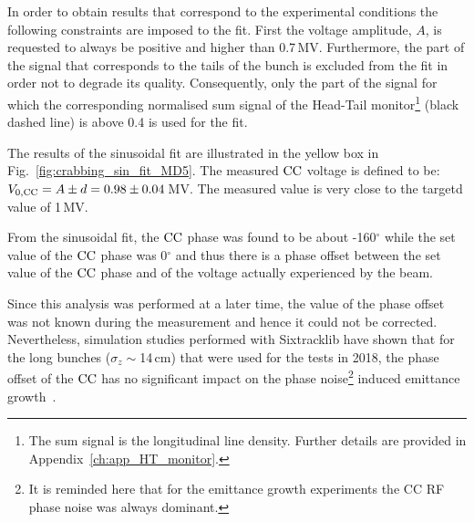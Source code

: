 In order to obtain results that correspond to the experimental conditions the following constraints are imposed to the fit. First the voltage amplitude, $A$, is requested to always be positive and higher than 0.7\,MV. Furthermore, the part of the signal that corresponds to the tails of the bunch is excluded from the fit in order not to degrade its quality. Consequently, only the part of the signal for which the corresponding normalised sum signal of the Head-Tail monitor\footnote{The sum signal is the longitudinal line density. Further details are provided in Appendix~\ref{ch:app_HT_monitor}.} (black dashed line) is above 0.4 is used for the fit. 

The results of the sinusoidal fit are illustrated in the yellow box in Fig.~\ref{fig:crabbing_sin_fit_MD5}. The measured ${\mathrm{CC}}$ voltage is defined to be: ${V_\mathrm{0, CC}}= A \pm d=0.98\pm0.04$\,MV. The measured value is very close to the targetd value of 1\,MV. 

From the sinusoidal fit, the ${\mathrm{CC}}$ phase was found to be about -160$^\circ$ while the set value of the ${\mathrm{CC}}$ phase was 0$^\circ$ and thus there is a phase offset between the set value of the ${\mathrm{CC}}$ phase and of the voltage actually experienced by the beam.



Since this analysis was performed at a later time, the value of the phase offset was not known during the measurement and hence it could not be corrected. Nevertheless, simulation studies performed with Sixtracklib have shown that for the long bunches ($\sigma_z \sim$14\,cm) that were used for the tests in 2018, the phase offset of the ${\mathrm{CC}}$ has no significant impact on the phase noise\footnote{It is reminded here that for the emittance growth experiments the CC RF phase noise was always dominant.} induced emittance growth~\cite{wp4_triantafyllou_2020}. %

